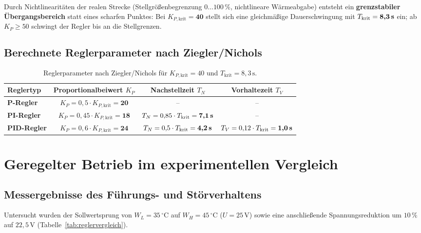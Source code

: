 \documentclass[a4paper,10pt,department=FakEI]{OTHRartcl}
\begin{document}
Durch Nichtlinearitäten der realen Strecke (Stellgrößenbegrenzung $0\dots 100\,\%$, nichtlineare Wärmeabgabe) entsteht ein \textbf{grenzstabiler Übergangsbereich} statt eines scharfen Punktes: Bei $K_{P,\text{krit}} = \textbf{40}$ stellt sich eine gleichmäßige Dauerschwingung mit $T_{\text{krit}} = \textbf{8,3\,s}$ ein; ab $K_P \ge 50$ schwingt der Regler bis an die Stellgrenzen.

\subsection{Berechnete Reglerparameter nach Ziegler/Nichols}
\begin{table}[H]
\centering
\small
\caption{Reglerparameter nach Ziegler/Nichols für $K_{P,\text{krit}} = 40$ und $T_{\text{krit}} = 8{,}3\,\text{s}$.}
\label{tab:zn_parameter}
\begin{tabular*}{\textwidth}{@{\extracolsep{\fill}}lccc@{}}
\toprule
\textbf{Reglertyp} & \textbf{Proportionalbeiwert $K_P$} & \textbf{Nachstellzeit $T_N$} & \textbf{Vorhaltezeit $T_V$} \\
\midrule
\textbf{P-Regler}   & $K_P = 0{,}5 \cdot K_{P,\text{krit}} = \textbf{20}$  & -- & -- \\
\textbf{PI-Regler}  & $K_P = 0{,}45 \cdot K_{P,\text{krit}} = \textbf{18}$ & $T_N = 0{,}85 \cdot T_{\text{krit}} = \textbf{7,1\,s}$ & -- \\
\textbf{PID-Regler} & $K_P = 0{,}6 \cdot K_{P,\text{krit}} = \textbf{24}$  & $T_N = 0{,}5 \cdot T_{\text{krit}} = \textbf{4,2\,s}$  & $T_V = 0{,}12 \cdot T_{\text{krit}} = \textbf{1,0\,s}$ \\
\bottomrule
\end{tabular*}
\end{table}

\section{Geregelter Betrieb im experimentellen Vergleich}
\subsection{Messergebnisse des Führungs- und Störverhaltens}
Untersucht wurden der Sollwertsprung von $W_L = 35\,^\circ\text{C}$ auf $W_H = 45\,^\circ\text{C}$ ($U = 25\,\text{V}$) sowie eine anschließende Spannungsreduktion um $10\,\%$ auf $22{,}5\,\text{V}$ (Tabelle~\ref{tab:reglervergleich}).
\end{document}
